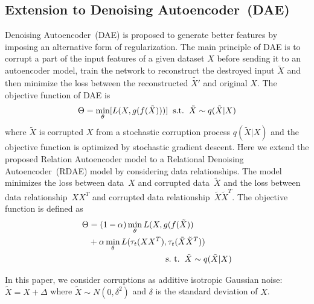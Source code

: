 \documentclass[conference]{IEEEtran}
\begin{document}
	\subsection{Extension to Denoising Autoencoder~(DAE)}
	Denoising Autoencoder~(DAE) is proposed to generate better features by imposing an alternative form of regularization. The main principle of DAE is to corrupt a part of the input features of a given dataset $X$ before sending it to an autoencoder model, train the network to reconstruct the destroyed input $\tilde{X}$ and then minimize the loss between the reconstructed $\tilde{X'}$ and original $X$. The objective function of DAE is
	\begin{equation}
	\Theta = \min_{\theta}[L(X, g(f(\tilde{X})))] \hspace{2mm} \text{s.t.} \hspace{2mm}
	\tilde{X} \sim q(\tilde{X}|X)
	\end{equation}
	where $\tilde{X}$ is corrupted $X$ from a stochastic corruption process $q(\tilde{X}|X)$ and the objective function is optimized by stochastic gradient descent. Here we extend the proposed Relation Autoencoder model to a Relational Denoising Autoencoder~(RDAE) model by considering data relationships. The model minimizes the loss between data~$X$ and corrupted data~$\tilde{X}$ and the loss between data relationship~$XX^{T}$ and corrupted data relationship~$\tilde{X}\tilde{X}^{T}$. The objective function is defined as
	\begin{equation}
		\begin{split}
			\Theta &= (1-\alpha)\min_{\theta} L(X, g(f(\tilde{X})) \\
			& + \alpha\min_{\theta}L(\tau_{t}(XX^{T}), \tau_{t}(\tilde{X}\tilde{X}^{T})) \\
			& \hspace{3.2cm} \text{s.~t.} \hspace{2mm}\tilde{X} \sim q(\tilde{X}|X)
		\end{split}
	\end{equation}
	
	In this paper, we consider corruptions as additive isotropic Gaussian noise: $\tilde{X}=X+\varDelta$ where $\tilde{X} \sim N(0, \delta^{2})$ and $\delta$ is the standard deviation of $X$.
	
\end{document}
